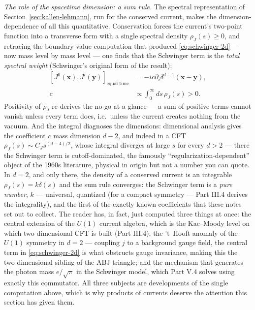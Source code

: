\begin{eexample}
\emph{The role of the spacetime dimension: a sum rule.} The spectral representation
of Section~\ref{sec:kallen-lehmann}, run for the conserved current, makes the
dimension-dependence of all this quantitative. Conservation forces the
current's two-point function into a transverse form with a single spectral
density $\rho_J(s) \ge 0$, and retracing the boundary-value computation that
produced \eqref{eq:schwinger-2d} --- now mass level by mass level --- one
finds that the Schwinger term is the \emph{total spectral weight}
(Schwinger's original form of the result):
\begin{equation}
\begin{aligned}
\left[J^0(\mathbf{x}),J^i(\mathbf{y})\right]_{\text{equal time}}
&= -ic\partial_i\delta^{d-1}(\mathbf{x} - \mathbf{y}),\\
c &\propto \int_0^\infty ds\,\rho_J(s) >0.
\end{aligned}
\label{eq:schwinger-sum-rule}
\end{equation}
Positivity of $\rho_J$ re-derives the no-go at a glance --- a sum of positive
terms cannot vanish unless every term does, i.e.\ unless the current creates
nothing from the vacuum. And the integral diagnoses the dimensions:
dimensional analysis gives the coefficient $c$ mass dimension $d-2$, and
indeed in a CFT $\rho_J(s) \sim C_J s^{(d-4)/2}$, whose integral diverges
at large $s$ for every $d > 2$ --- there the Schwinger term is
cutoff-dominated, the famously ``regularization-dependent'' object of the
1960s literature, physical in origin but not a number you can quote. In
$d = 2$, and only there, the density of a conserved current is an integrable
$\rho_J(s) = k\delta(s)$ and the sum rule converges: the Schwinger term is
a \emph{pure number}, $k$ --- universal, quantized (for a compact symmetry
--- Part III.4 derives the integrality), and the first of the exactly known
coefficients that these notes set out to collect. The reader has, in fact,
just computed three things at once: the central extension of the $U(1)$
current algebra, which is the Kac--Moody level on which two-dimensional CFT
is built (Part III.4); the 't~Hooft anomaly of the $U(1)$ symmetry in $d =
2$ --- coupling $j$ to a background gauge field, the central term in
\eqref{eq:schwinger-2d} is what obstructs gauge invariance, making this the
two-dimensional sibling of the ABJ triangle; and the mechanism that
generates the photon mass $e/\sqrt\pi$ in the Schwinger model, which Part
V.4 solves using exactly this commutator. All three subjects are
developments of the single computation above, which is why products of
currents deserve the attention this section has given them.
\end{eexample}

